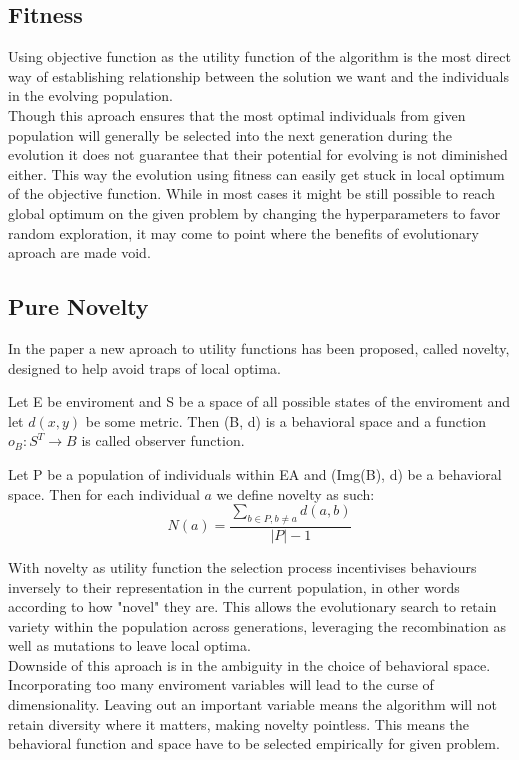 \subsection{Fitness}
Using objective function as the utility function of the algorithm is the most direct way of establishing relationship between the solution we want and the individuals in the evolving population.\\
Though this aproach ensures that the most optimal individuals from given population  will generally be selected into the next generation during the evolution it does not guarantee that their potential for evolving is not diminished either. This way the evolution using fitness can easily get stuck in local optimum of the objective function. While in most cases it might be still possible to reach global optimum on the given problem by changing the hyperparameters to favor random exploration, it may come to point where the benefits of evolutionary aproach are made void.
\subsection{Pure Novelty}
In the paper \cite{noveltyarticle} a new aproach to utility functions has been proposed, called novelty, designed to help avoid traps of local optima. 
\begin{defn}\citep{doncieux:hal-02561846}
Let E be enviroment and S be a space of all possible states of the enviroment and let $ d(x,y) $ be some metric. Then (B, d) is a behavioral space and a function $ o_B: S^{T}\rightarrow B $ is called observer function. 
\end{defn}
\begin{defn}\citep{noveltyarticle}
Let P be a population of individuals within EA and (Img(B), d) be a behavioral space. Then for each individual $ a $ we define novelty as such:  $$ N(a) =\frac{\sum_{b\in P, b\neq a}d(a,b)}{|P|-1} $$ 
\end{defn}
With novelty as utility function the selection process incentivises behaviours inversely to their representation in the current population, in other words according to how "novel" they are. This allows the evolutionary search to retain variety within the population across generations, leveraging the recombination as well as mutations to leave local optima.\\
Downside of this aproach is in the ambiguity in the choice of behavioral space. Incorporating too many enviroment variables will lead to the curse of dimensionality. Leaving out an important variable means the algorithm will not retain diversity where it matters, making novelty pointless. This means the behavioral function and space have to be selected empirically for given problem.
